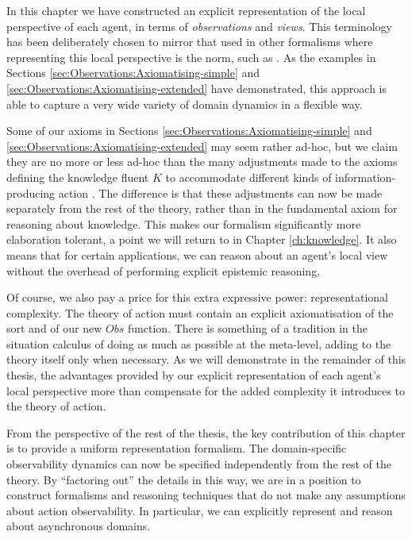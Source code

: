 In this chapter we have constructed an explicit representation of
the local perspective of each agent, in terms of \emph{observations}
and \emph{views}. This terminology has been deliberately chosen to
mirror that used in other formalisms where representing this local
perspective is the norm, such as \citep{parikh85dist_knowledge,halpern90knowledge_distrib}.
As the examples in Sections \ref{sec:Observations:Axiomatising-simple}
and \ref{sec:Observations:Axiomatising-extended} have demonstrated,
this approach is able to capture a very wide variety of domain dynamics
in a flexible way.

Some of our axioms in Sections \ref{sec:Observations:Axiomatising-simple}
and \ref{sec:Observations:Axiomatising-extended} may seem rather
ad-hoc, but we claim they are no more or less ad-hoc than the many
adjustments made to the axioms defining the knowledge fluent $K$
to accommodate different kinds of information-producing action \citep{shapiro98specifying_ma_systems,Lesperance99sitcalc_approach,shapiro01casl_feat_inter,Petrick06thesis,shapiro07sc_goal_change}.
The difference is that these adjustments can now be made separately
from the rest of the theory, rather than in the fundamental axiom
for reasoning about knowledge. This makes our formalism significantly
more elaboration tolerant, a point we will return to in Chapter \ref{ch:knowledge}.
It also means that for certain applications, we can reason about an
agent's local view without the overhead of performing explicit epistemic
reasoning.

Of course, we also pay a price for this extra expressive power: representational
complexity. The theory of action must contain an explicit axiomatisation
of the  sort and of our new $Obs$ function. There
is something of a tradition in the situation calculus of doing as
much as possible at the meta-level, adding to the theory itself only
when necessary. As we will demonstrate in the remainder of this thesis,
the advantages provided by our explicit representation of each agent's
local perspective more than compensate for the added complexity it
introduces to the theory of action.

From the perspective of the rest of the thesis, the key contribution
of this chapter is to provide a uniform representation formalism.
The domain-specific observability dynamics can now be specified independently
from the rest of the theory. By {}``factoring out'' the details
in this way, we are in a position to construct formalisms and reasoning
techniques that do not make any assumptions about action observability.
In particular, we can explicitly represent and reason about asynchronous
domains.

